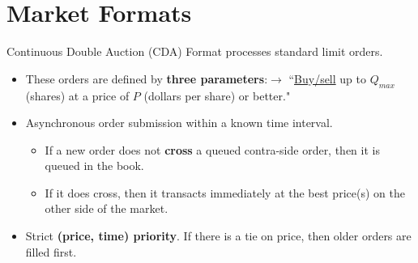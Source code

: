 \documentclass[10pt]{beamer}
\begin{document}


    

\section{Market Formats}
\begin{frame}{Continuous Double Auction (CDA) Format}
processes standard limit orders.
\begin{itemize}
    \item These orders are defined by \textbf{three parameters}:$\rightarrow$ ``\underline{Buy/sell} up to \underline{$Q_{max}$} (shares) at a price of \underline{$P$} (dollars per share) or better."
\item Asynchronous order submission within a known time interval. 
\begin{itemize}
\item If a new order does not \textbf{cross} a queued contra-side order, then it is queued in the book. 
\item If it does cross, then it transacts immediately at the best price(s) on the other side of the market.
\end{itemize}
\item Strict \textbf{(price, time) priority}. If there is a tie on price, then older orders are filled first.
    \end{itemize} 
\end{frame}
\end{document}
